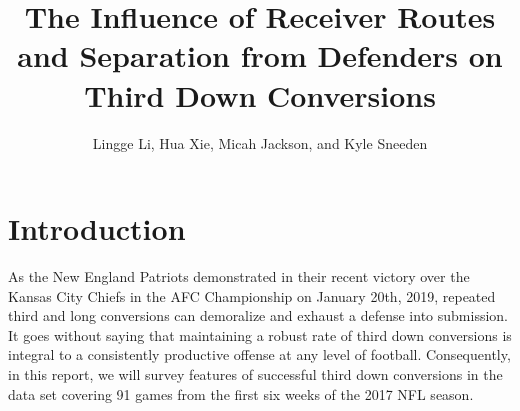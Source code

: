 \documentclass[12pt,letterpaper]{article}
\title{The Influence of Receiver Routes and Separation from Defenders on Third Down Conversions}
\author{Lingge Li, Hua Xie, Micah Jackson, and Kyle Sneeden}
\begin{document}

\maketitle

\section*{Introduction}

As the New England Patriots demonstrated in their recent victory over the Kansas City Chiefs in the AFC Championship on January 20th, 2019, repeated third and long conversions can demoralize and exhaust a defense into submission. It goes without saying that maintaining a robust rate of third down conversions is integral to a consistently productive offense at any level of football. Consequently, in this report, we will survey features of successful third down conversions in the data set covering 91 games from the first six weeks of the 2017 NFL season.
\end{document}
